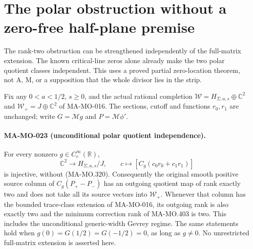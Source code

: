 \section{The polar obstruction without a zero-free half-plane premise}
\label{sec:polar-critical-line-obstruction}

The rank-two obstruction can be strengthened independently of
the full-matrix extension. The known critical-line zeros alone
already make the two polar quotient classes independent.
This uses a proved partial zero-location theorem, not A, M,
or a supposition that the whole divisor lies in the strip.

Fix any \(0<a<1/2\), \(s\ge0\), and the actual rational
completion \(\mathcal W=H_{\Sigma,a,s}\oplus\mathbb C^2\)
and \(\mathcal W_+=J\oplus\mathbb C^2\) of MA-MO-016.
The sections, cutoff and functions \(r_0,r_1\) are unchanged;
write \(G=\mathcal Mg\) and \(P=\mathcal M\phi'\).

\paragraph{MA-MO-023 (unconditional polar quotient independence).}
For every nonzero \(g\in C_c^\infty(\mathbb R)\),
\[
 \mathbb C^2\longrightarrow H_{\Sigma,a,s}/J,
       \qquad c\longmapsto[C_g(c_0r_0+c_1r_1)]
 \tag{MA-MO.500}
\]
is injective, without (MA-MO.320). Consequently the original
smooth positive source column of \(C_g(P_+-P_-)\) has an
outgoing quotient map of rank exactly two and does not take
all its source vectors into \(\mathcal W_+\).
Whenever that column has the bounded trace-class extension
of MA-MO-016, its outgoing rank is also exactly two and the
minimum correction rank of MA-MO.403 is two. This includes
the unconditional generic-width Gevrey regime. The same
statements hold when \(g(0)=G(1/2)=G(-1/2)=0\), as long
as \(g\ne0\). No unrestricted full-matrix extension is
asserted here.

